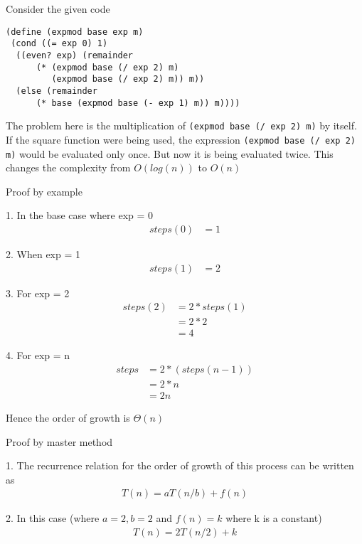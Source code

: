 \documentclass[a4paper,12pt]{article}
\begin{document}
\noindent Consider the given code

\lstset{
language=Lisp,                            
basicstyle=\ttfamily,  
}

\begin{lstlisting}
(define (expmod base exp m)
 (cond ((= exp 0) 1)
  ((even? exp) (remainder 
      (* (expmod base (/ exp 2) m)
         (expmod base (/ exp 2) m)) m))
  (else (remainder 
      (* base (expmod base (- exp 1) m)) m))))
\end{lstlisting}

\bigskip\noindent The problem here is the multiplication of \texttt{(expmod base (/ exp 2) m)} by itself.
If the square function were being used, the expression \texttt{(expmod base (/ exp 2) m)}
would be evaluated only once. But now it is being evaluated twice. This changes
the complexity from $O(log(n))$ to $O(n)$

\bigskip\noindent Proof by example

1. In the base case where exp = 0
\begin{align}
steps(0) &= 1 
\end{align}

2. When exp = 1
\begin{align}
steps(1) &= 2
\end{align}

3. For exp = 2
\begin{align}
steps(2) &= 2 * steps(1) \\
& = 2 * 2 \\
& = 4
\end{align}
                  
4. For exp = n
\begin{align}
steps &= 2 * (steps(n-1)) \\
& = 2 * n \\
& = 2n
\end{align}

Hence the order of growth is $\Theta(n)$

\bigskip\noindent Proof by master method

1. The recurrence relation for the order of growth of this process can be
written as
\begin{align}T(n) = aT(n/b) + f(n)\end{align}

2. In this case (where $a=2, b=2$ and $f(n)=k$ where k is a constant)
\begin{align}T(n) = 2T(n/2) + k\end{align}
\end{document}

